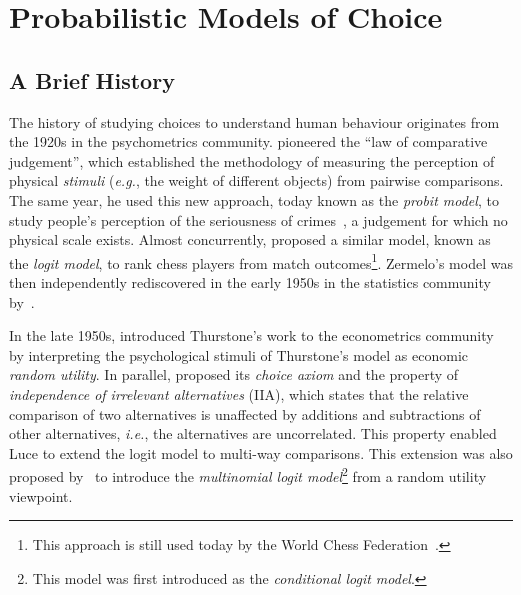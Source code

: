 \section{Probabilistic Models of Choice}
\label{in:sec:models}

\subsection{A Brief History}

The history of studying choices to understand human behaviour originates from the 1920s in the psychometrics community.
\citet{thurstone1927law} pioneered the ``law of comparative judgement'', which established the methodology of measuring the perception of physical \emph{stimuli} (\textit{e.g.}, the weight of different objects) from pairwise comparisons.
The same year, he used this new approach, today known as the \emph{probit model}, to study people's perception of the seriousness of crimes~\citep{thurstone1927method}, a judgement for which no physical scale exists.
Almost concurrently, \citet{zermelo1928berechnung} proposed a similar model, known as the \emph{logit model}, to rank chess players from match outcomes\footnote{This approach is still used today by the World Chess Federation~\citep{elo1978rating}.}.
Zermelo's model was then independently rediscovered in the early 1950s in the statistics community by~\citet{bradley1952rank}.

In the late 1950s, \citet{marschak1959binary} introduced Thurstone's work to the econometrics community by interpreting the psychological stimuli of Thurstone's model as economic \emph{random utility}.
In parallel, \citet{luce1959individual} proposed its \emph{choice axiom} and the property of \emph{independence of irrelevant alternatives} (IIA), which states that the relative comparison of two alternatives is unaffected by additions and subtractions of other alternatives, \textit{i.e.}, the alternatives are uncorrelated.
This property enabled Luce to extend the logit model to multi-way comparisons.
This extension was also proposed by~\citet{mcfadden1973conditional} to introduce the \emph{multinomial logit model}\footnote{This model was first introduced as the \emph{conditional logit model}.} from a random utility viewpoint.

